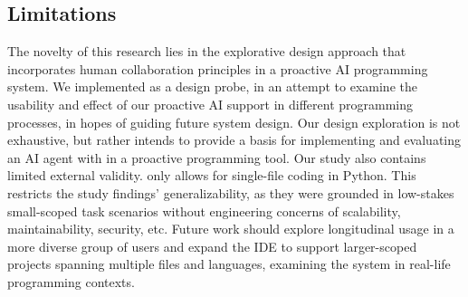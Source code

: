 


\subsection{Limitations}
The novelty of this research lies in the explorative design approach that incorporates human collaboration principles in a proactive AI programming system.
We implemented \sys{} as a design probe, in an attempt to examine the usability and effect of our proactive AI support in different programming processes, in hopes of guiding future system design.
Our design exploration is not exhaustive, but rather intends to provide a basis for implementing and evaluating an AI agent with in a proactive programming tool.
Our study also contains limited external validity. 
\sys{} only allows for single-file coding in Python. 
This restricts the study findings' generalizability, as they were grounded in low-stakes small-scoped task scenarios without engineering concerns of scalability, maintainability, security, etc.
Future work should explore longitudinal usage in a more diverse group of users and expand the IDE to support larger-scoped projects spanning multiple files and languages, examining the system in real-life programming contexts. 

